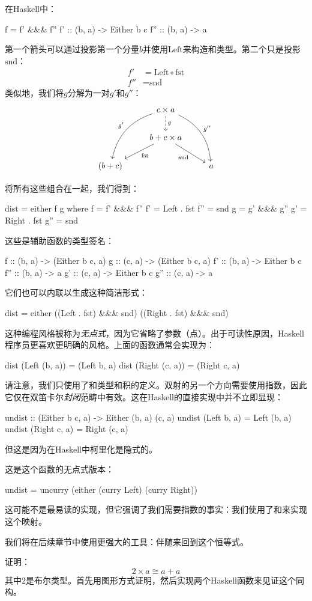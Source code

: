 \documentclass[DaoFP]{subfiles}
\begin{document}
在Haskell中：
\begin{haskell}
f = f' &&& f''
f'  :: (b, a) -> Either b c
f'' :: (b, a) -> a
\end{haskell}
第一个箭头可以通过投影第一个分量$b$并使用$\text{Left}$来构造和类型。第二个只是投影$\text{snd}$：
\begin{align*}
f' &= \text{Left} \circ \text{fst} \\
f'' &= \text{snd}
\end{align*}
类似地，我们将$g$分解为一对$g'$和$g''$：
\[
\begin{tikzcd}
& c \times a
\arrow[d, dashed, "g"]
\arrow[ddl, bend right, "g'"']
\arrow[ddr, bend left, "g''"]
\\
& b + c \times a
\arrow[dl,  "\text{fst}"]
\arrow[dr,   "\text{snd}"']
\\
(b + c) && a
\end{tikzcd}
\]

将所有这些组合在一起，我们得到：
\begin{haskell}
dist = either f g
where
f   = f' &&& f''
f'  = Left . fst
f'' = snd
g   = g' &&& g''
g'  = Right . fst
g'' = snd
\end{haskell}
这些是辅助函数的类型签名：
\begin{haskell}
f   :: (b, a) -> (Either b c, a)
g   :: (c, a) -> (Either b c, a)
f'  :: (b, a) -> Either b c
f'' :: (b, a) -> a
g'  :: (c, a) -> Either b c
g'' :: (c, a) -> a
\end{haskell}
它们也可以内联以生成这种简洁形式：
\begin{haskell}
dist = either ((Left . fst) &&& snd) ((Right . fst) &&& snd)
\end{haskell}

这种编程风格被称为\emph{无点式}，因为它省略了参数（点）。出于可读性原因，Haskell程序员更喜欢更明确的风格。上面的函数通常会实现为：
\begin{haskell}
dist (Left  (b, a)) = (Left  b, a)
dist (Right (c, a)) = (Right c, a)
\end{haskell}

请注意，我们只使用了和类型和积的定义。双射的另一个方向需要使用指数，因此它仅在双笛卡尔\emph{封闭}范畴中有效。这在Haskell的直接实现中并不立即显现：
\begin{haskell}
undist :: (Either b c, a) -> Either (b, a) (c, a)
undist (Left b, a)  = Left (b, a)
undist (Right c, a) = Right (c, a)
\end{haskell}
但这是因为在Haskell中柯里化是隐式的。

这是这个函数的无点式版本：
\begin{haskell}
undist = uncurry (either (curry Left) (curry Right))
\end{haskell}
这可能不是最易读的实现，但它强调了我们需要指数的事实：我们使用了和来实现这个映射。

我们将在后续章节中使用更强大的工具：伴随来回到这个恒等式。

\begin{exercise}
证明：
\[ 2 \times a \cong a + a \]
其中$2$是布尔类型。首先用图形方式证明，然后实现两个Haskell函数来见证这个同构。
\end{exercise}
\end{document}
